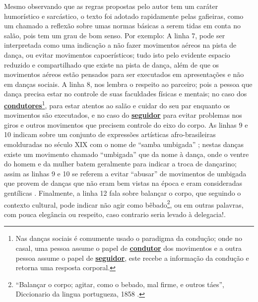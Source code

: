 Mesmo observando que as regras propostas pelo autor tem um caráter humorístico e sarcástico,
o texto foi adotado rapidamente pelas gafieiras, como um chamado a reflexão sobre umas
normas básicas a serem tidas em conta no salão, pois tem um grau de bom senso. Por exemplo: 
A linha 7, pode ser interpretada como uma indicação a 
não fazer movimentos aéreos na pista de dança,
ou  evitar movimentos capoerísticos; tudo isto
pelo evidente espacio reduzido e compartilhado que existe na pista de dança, 
além de que os movimentos aéreos estão pensados para ser
executados em apresentações e não em danças sociais. 
A linha 8, nos lembra o respeito ao parceiro; pois a pessoa que dança precisa
estar no controle de suas faculdades físicas e mentais; 
no caso dos \hyperref[def:Condutor]{\textbf{condutores}}\footnote{\label{footlab:conducao}Nas danças sociais é comumente usado o paradigma da condução; 
onde no casal, uma pessoa assume o papel de \hyperref[def:Condutor]{\textbf{condutor}} dos movimentos e 
a outra pessoa assume o papel de \hyperref[def:Seguidor]{\textbf{seguidor}}, este recebe a informação da condução e retorna uma resposta corporal.}, 
para estar atentos ao salão e cuidar do seu par enquanto os movimentos são executados, 
e no caso do \hyperref[def:Seguidor]{\textbf{seguidor}} para evitar problemas
nos giros e outros movimentos que precisem  controle do eixo do corpo.
As linhas 9 e 10 indicam sobre um conjunto de expressões artísticas 
afro-brasileiras emolduradas no século XIX com o nome de ``samba umbigada'' \cite[pp. 47]{diniz2008almanaque} \cite[pp. 85]{sandroni2001feitico}; nestas danças existe
um movimento chamado ``umbigada'' \cite[pp. 50]{da2015historia} que da nome à dança, onde o ventre do homem e da mulher batem geralmente para indicar
a troca de dançarino; assim as linhas 9 e 10 se referem a
 evitar ``abusar'' de movimentos de umbigada que provem de danças que não eram bem vistas na época e eram consideradas gentílicas \cite[pp. 85]{sandroni2001feitico}.
Finalmente,
a linha 12 fala sobre balançar o corpo, que seguindo o contexto cultural, 
pode indicar não agir como bêbado\footnote{``Balançar o corpo; agitar, como o bebado, mal firme, e outros táes'', Diccionario da lingua portugueza, 1858 \cite[pp.296]{diccionario1858}.}, ou em outras palavras,
com pouca elegância ou respeito,
caso contrario seria levado à delegacia!.


